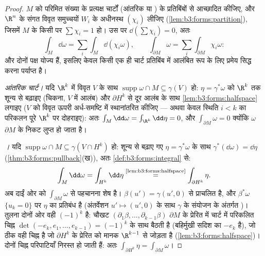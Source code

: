 \begin{proof}
 $M$ को परिमित संख्या के प्रत्यक्ष चार्टों (आंतरिक या
) के प्रतिबिंबों से आच्छादित कीजिए, और $\R^n$ के संगत विवृत
समुच्चयों $W_i$ के अधीनस्थ  $(\chi_i)$ लीजिए (\cref{lem:b3:forms:partition}),
जिसमें $M$ के किसी  पर $\sum\chi_i
= 1$ हो। उस  पर $\dd(\sum\chi_i) = 0$,
अतः
\[
\int_M\dd\omega = \sum_i\int_M\dd(\chi_i\omega),
\qquad
\int_{\partial M}\omega =
\sum_i\int_{\partial M}\chi_i\omega :
\]
और दोनों पक्ष योज्य हैं, इसलिए केवल किसी एक ही चार्ट प्रतिबिंब में
आलंबित रूप के लिए प्रमेय सिद्ध करना पर्याप्त है।

\emph{आंतरिक चार्ट।} यदि $\R^k$ में विवृत $V$ के साथ $\operatorname{supp}\omega \cap M
\subseteq \gamma(V)$ हो:
$\eta =
\gamma^*\omega$ को $\R^k$ तक शून्य से बढ़ाइए (चिकना, $V$ में  आलंब) और
$\partial H^k$ से दूर आलंब के साथ \cref{lem:b3:forms:halfspace} लगाइए ($V$ को विवृत ऊपरी
अर्ध-समष्टि में स्थानांतरित कीजिए --- अथवा केवल स्थिति $i < k$ का
परिकलन पूरे $\R^k$ पर दोहराइए): अतः $\int_M\dd\omega =
\int_{\R^k}\dd\eta = 0$, और $\int_{\partial M}\omega = 0$ क्योंकि $\omega$
$\partial M$ के निकट लुप्त हो जाता है।

\emph{।} यदि $\operatorname{supp}\omega\cap M
\subseteq \gamma(V \cap H^k)$ हो: शून्य से बढ़ाए गए $\eta = \gamma^*\omega$ के
साथ
$\gamma^*(\dd\omega) = \dd\eta$
(\cref{thm:b3:forms:pullback}(ख)), अतः \cref{def:b3:forms:integral} से:
\[
\int_M\dd\omega = \int_{H^k}\dd\eta
\overset{\text{\cref{lem:b3:forms:halfspace}}}{=}
\int_{\partial H^k}\eta .
\]
अब दाईं ओर को $\int_{\partial
M}\omega$ से पहचानना शेष है।  $\beta(u') =
\gamma(u', 0)$ से प्राचलित
है, और $\beta^*\omega$ $\{u_k = 0\}$ पर $\eta$ का प्रतिबंध है (अंतर्वेशन $u'
\mapsto (u', 0)$ के
साथ $\gamma$ के संयोजन के अंतर्गत )।  तुलना दोनों
ओर वही $(-1)^k$ है: चौखट $(\partial_1\beta, \dots, \partial_{k-1}\beta)$ $\partial M$ के प्रेरित  में चार्ट
में परिकलित चिह्न $\det(-e_k, e_1, \dots, e_{k-1}) = (-1)^k$ के साथ बैठती है (बहिर्मुखी सदिश का
 $-e_k$ है), जो ठीक वही चिह्न है जो $\partial H^k$ के प्रेरित
 को मानक $\R^{k-1}$ से जोड़ता है (\cref{lem:b3:forms:halfspace})। दोनों चिह्न
परिपाटियाँ निरस्त हो जाती हैं: अतः $\int_{\partial H^k}\eta = \int_{\partial M}\omega$।
\end{proof}

